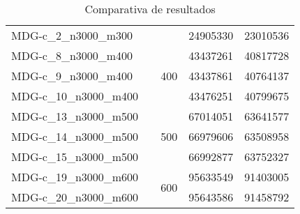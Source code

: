 \begin{table}[h!]
\begin{tabular}{lc|cll}
    MDG-c\_2\_n3000\_m300 &  &  & 24905330 & 23010536 \\ \cline{3-5} 
    MDG-c\_8\_n3000\_m400 &  & \multirow{3}{*}{400} & 43437261 & 40817728 \\
    MDG-c\_9\_n3000\_m400 &  &  & 43437861 & 40764137 \\
    MDG-c\_10\_n3000\_m400 &  &  & 43476251 & 40799675 \\ \cline{3-5} 
    MDG-c\_13\_n3000\_m500 &  & \multirow{3}{*}{500} & 67014051 & 63641577 \\
    MDG-c\_14\_n3000\_m500 &  &  & 66979606 & 63508958 \\
    MDG-c\_15\_n3000\_m500 &  &  & 66992877 & 63752327 \\ \cline{3-5} 
    MDG-c\_19\_n3000\_m600 &  & \multirow{2}{*}{600} & 95633549 & 91403005 \\
    MDG-c\_20\_n3000\_m600 &  &  & 95643586 & 91458792 \\ \bottomrule
    \end{tabular}
    \caption{Comparativa de resultados}
    \label{tab:resultados}
\end{table}